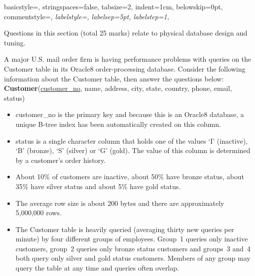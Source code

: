 \documentclass[markingschedule]{ouexam}
\begin{document}
\lstset%
{	basicstyle=\sffamily,
	stringspaces=false,
	tabsize=2,
	indent=1cm,
	belowskip=0pt,
	commentstyle=\itshape,
	labelstyle=\scriptsize,
	labelsep=5pt,
	labelstep=1,
}

\maketitlepage


\begin{examsection}{25}{}{Questions in this section (total 25 marks) relate to
physical database design and tuning.}


\begin{question}{10}

	A major U.S. mail order firm is having performance problems with queries on
	the \textsf{Customer} table in its Oracle8 order-processing database.
	Consider the following information about the \textsf{Customer} table, then
	answer the questions below:	\\

	\textsf{\textbf{Customer}(\underline{customer\_no}, name, address, city,
	state, country, phone, email, status)}

	\begin{itemize}

		\item \textsf{customer\_no} is the primary key and because this is an
		Oracle8 database, a unique B-tree index has been automatically created
		on this column.

		\item \textsf{status} is a single character column that holds one of
		the values `I' (inactive), `B' (bronze), `S' (silver) or `G' (gold).
		The value of this column is determined by a customer's order history.

		\item About 10\% of customers are inactive, about 50\% have bronze
		status, about 35\% have silver status and about 5\% have gold status.

		\item The average row size is about 200 bytes and there are
		approximately 5,000,000 rows.

		\item The \textsf{Customer} table is heavily queried (averaging thirty
		new queries per minute) by four different groups of employees. Group~1
		queries only inactive customers, group~2 queries only bronze status
		customers and groups~3 and~4 both query only silver and gold status
		customers. Members of any group may query the table at any time and
		queries often overlap.


\end{itemize}
\end{question}
\end{examsection}
\end{document}
